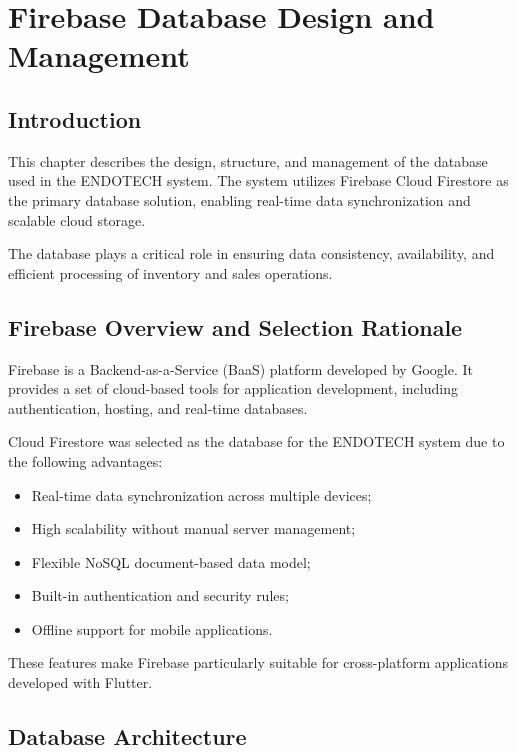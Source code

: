 \chapter{Firebase Database Design and Management}

\section{Introduction}

This chapter describes the design, structure, and management of the database used in the ENDOTECH system. The system utilizes Firebase Cloud Firestore as the primary database solution, enabling real-time data synchronization and scalable cloud storage.

The database plays a critical role in ensuring data consistency, availability, and efficient processing of inventory and sales operations.

\section{Firebase Overview and Selection Rationale}

Firebase is a Backend-as-a-Service (BaaS) platform developed by Google. It provides a set of cloud-based tools for application development, including authentication, hosting, and real-time databases.

Cloud Firestore was selected as the database for the ENDOTECH system due to the following advantages:

\begin{itemize}
    \item Real-time data synchronization across multiple devices;
    \item High scalability without manual server management;
    \item Flexible NoSQL document-based data model;
    \item Built-in authentication and security rules;
    \item Offline support for mobile applications.
\end{itemize}

These features make Firebase particularly suitable for cross-platform applications developed with Flutter.

\section{Database Architecture}

